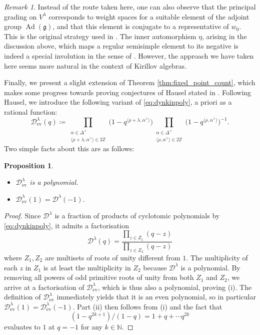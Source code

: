 \documentclass{amsart}
\newcommand{\Ad}{\operatorname{Ad}}
\newcommand{\D}{\mathcal{D}}
\newcommand{\g}{\mathfrak{g}}
\newcommand{\N}{\mathbb{N}}
\newcommand{\Z}{\mathbb{Z}}
\newcommand{\inv}{^{-1}}
\theoremstyle{definition}
\theoremstyle{plain}
\newtheorem{prop}[defn]{Proposition}
\theoremstyle{remark}
\newtheorem{rmk}[defn]{Remark}
\begin{document}
\begin{rmk}
    Instead of the route taken here, one can also observe that the principal grading on $V^\lambda$ corresponds to weight spaces for a suitable element of the adjoint group $\Ad (\g)$, and that this element is conjugate to a representative of $w_0$. This is the original strategy used in \cite{Stembridge1994_minuscule}. The inner automorphism $\eta$, arising in the discussion above, which maps a regular semisimple element to its negative is indeed a special involution in the sense of \cite[p.\,15]{Stembridge1994_minuscule}. However, the approach we have taken here seems more natural in the context of Kirillov algebras.
\end{rmk}

Finally, we present a slight extension of Theorem \ref{thm:fixed_point_count}, which makes some progress towards proving conjectures of Hausel stated in \cite[slide 7]{Hausel2023_ICMAT}. Following Hausel, we introduce the following variant of \eqref{eq:dynkinpoly}, a priori as a rational function:
\begin{equation}
\label{eq:dinkin_even}
   \D^\lambda_{\mathrm{ev}}(q)
    \coloneqq
    \prod_{\substack{
        \alpha \in \Delta^+\\
        \langle \rho +\lambda, \alpha^\vee \rangle \in 2\Z
    }}\!\!\!\!     
        \big(1 - q^{\langle \rho +\lambda, \alpha^\vee \rangle}\big)
    \prod_{\substack{
        \alpha \in \Delta^+\\
        \langle \rho, \alpha^\vee \rangle \in 2\Z
    }}\!\!\!     
        \big(1 - q^{\langle \rho, \alpha^\vee \rangle}\big)\inv.
\end{equation}
Two simple facts about this are as follows:
\begin{prop}
\label{prop:Dynkin_even_basics}
\leavevmode
\begin{itemize}
    \item[(i)] $\D^\lambda_{\mathrm{ev}}$ is a polynomial.
    \item[(ii)] $\D^\lambda_{\mathrm{ev}}(1) = \D^\lambda(-1)$.
\end{itemize}
\end{prop}
\begin{proof}
    Since $\D^\lambda$ is a fraction of products of cyclotomic polynomials by \eqref{eq:dynkinpoly}, it admits a factorisation
    $$
        \D^\lambda(q)
        =
        \frac{\prod_{z\in Z_1} (q-z)}{\prod_{z\in Z_2} (q-z)}
    $$
    where $Z_1,Z_2$ are multisets of roots of unity different from $1$. The multiplicity of each $z$ in $Z_1$ is at least the multiplicity in $Z_2$ because $\D^\lambda$ is a polynomial. By removing all powers of odd primitive roots of unity from both $Z_1$ and $Z_2$, we arrive at a factorisation of $\D^\lambda_{\mathrm{ev}}$, which is thus also a polynomial, proving (i). The definition of $\D^\lambda_{\mathrm{ev}}$ immediately yields that it is an even polynomial, so in particular $\D^\lambda_{\mathrm{ev}}(1) = \D^\lambda_{\mathrm{ev}}(-1)$. Part (ii) then follows from (i) and the fact that
    $$
        (1-q^{2k+1})/(1-q) = 1 + q + \cdots q^{2k}
    $$
    evaluates to $1$ at $q=-1$ for any $k\in \N$.
\end{proof}
\end{document}
